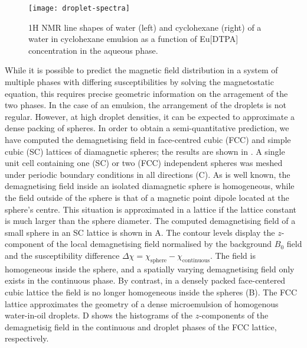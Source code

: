 \begin{figure}
  \begin{center}
    \texttt{[image: droplet-spectra]}
  \end{center}
  \caption{1H NMR line shapes of water (left) and cyclohexane (right) of a
  water in cyclohexane emulsion as a function of {Eu[DTPA]} concentration
  in the aqueous phase.
  }
  \label{fig:droplet-spectra}
\end{figure}




While it is possible to predict the magnetic field distribution in a system of
multiple phases with differing susceptibilities by solving the magnetostatic
equation, this requires precise geometric information on the arragement of the
two phases. In the case of an emulsion, the arrangement of the droplets is not
regular. However, at high droplet densities, it can be
expected to approximate  a dense packing of spheres. In order to obtain a
semi-quantitative prediction, we have computed the demagnetising field in
face-centred cubic  (FCC) and simple cubic (SC) lattices of diamagnetic spheres;
the results are shown in  . A single unit cell containing
one (SC) or
two (FCC) independent spheres was meshed under periodic boundary conditions in all
directions (C).
As is well known, the demagnetising field inside an isolated diamagnetic sphere
is homogeneous, while the field outside of the
sphere is that of a magnetic
point dipole located at the sphere's centre. This situation is approximated
in a lattice if the lattice constant is much larger than the sphere
diameter. The computed demagnetising field
of a small sphere in an SC lattice is shown in A.
The contour levels display the $z$-component of the local demagnetising field
normalised by the background $B_0$ field and the susceptibility difference
$\Delta\chi= \chi_\text{sphere}-\chi_\text{continuous}$. The field is homogeneous
inside the sphere, and a spatially varying demagnetising field only
exists in the continuous phase.
By contrast, in a
densely packed face-centered cubic lattice the field is no
longer homogeneous inside the spheres (B). The FCC
lattice approximates the geometry of a dense microemulsion of homogenous
water-in-oil droplets.  D shows the histograms of
the $z$-components of
the demagnetisig field in the continuous and droplet phases of the FCC
lattice, respectively.

